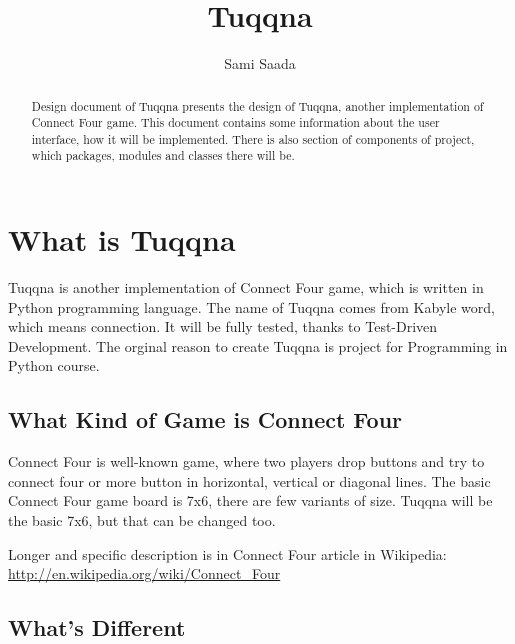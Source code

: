 \documentclass[gradu,emptyfirstpagenumber]{tktltiki}
\begin{document}
\title{Tuqqna}
\author{Sami Saada}
\subject{Programming in Python}

\maketitle

\begin{abstract}
Design document of Tuqqna presents the design of Tuqqna, another implementation
of Connect Four game. This document contains some information about the user
interface, how it will be implemented. There is also section of components of
project, which packages, modules and classes there will be.
\end{abstract}

\mytableofcontents

\section{What is Tuqqna}

Tuqqna is another implementation of Connect Four game, which is written in
Python programming language. The name of Tuqqna comes from Kabyle word, which
means connection. It will be fully tested, thanks to Test-Driven Development.
The orginal reason to create Tuqqna is project for Programming in Python course.

\subsection{What Kind of Game is Connect Four}

Connect Four is well-known game, where two players drop buttons and try to
connect four or more button in horizontal, vertical or diagonal lines. The basic
Connect Four game board is 7x6, there are few variants of size. Tuqqna will be
the basic 7x6, but that can be changed too.

Longer and specific description is in Connect Four article in Wikipedia:
\url{http://en.wikipedia.org/wiki/Connect_Four}

\subsection{What's Different}
\end{document}
